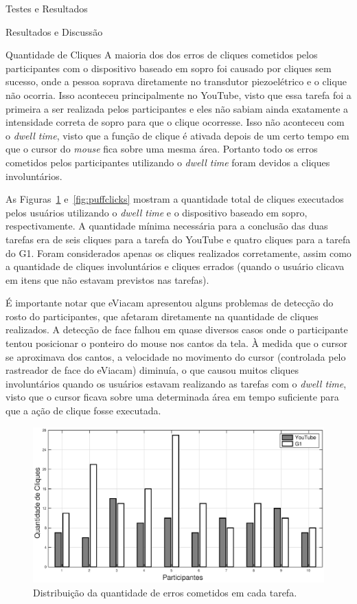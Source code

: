 \begin{chapter}{Testes e Resultados}
\begin{section}{Resultados e Discussão}
\begin{subsection}{Quantidade de Cliques}
A maioria dos dos erros de cliques cometidos pelos participantes com o
dispositivo baseado em sopro foi causado por cliques sem sucesso, onde a pessoa
soprava diretamente no transdutor piezoelétrico e o clique não ocorria. Isso
aconteceu principalmente no YouTube, visto que essa tarefa foi a primeira a ser
realizada pelos participantes e eles não sabiam ainda exatamente a intensidade
correta de sopro para que o clique ocorresse. Isso não aconteceu com o
\textit{dwell time}, visto que a função de clique é ativada depois de um certo
tempo em que o cursor do \textit{mouse} fica sobre uma mesma área. Portanto todo 
os erros cometidos pelos participantes utilizando o \textit{dwell time} foram
devidos a cliques involuntários.

As Figuras~\ref{fig:dwellclicks} e~\ref{fig:puffclicks} mostram a quantidade
total de cliques executados pelos usuários utilizando o \textit{dwell time} e o
dispositivo baseado em sopro, respectivamente. A quantidade mínima necessária
para a conclusão das duas tarefas era de seis cliques para a tarefa do YouTube e
quatro cliques para a tarefa do G1. Foram considerados apenas os cliques
realizados corretamente, assim como a quantidade de cliques involuntários e
cliques errados (quando o usuário clicava em itens que não estavam previstos nas
tarefas).


É importante notar que eViacam apresentou alguns problemas de detecção do rosto
do participantes, que afetaram diretamente na quantidade de cliques realizados.
A detecção de face falhou em quase diversos casos onde o participante tentou
posicionar o ponteiro do mouse nos cantos da tela. À medida que o cursor se
aproximava dos cantos, a velocidade no movimento do cursor (controlada pelo
rastreador de face do eViacam) diminuía, o que causou muitos cliques
involuntários quando os usuários estavam realizando as tarefas com o
\textit{dwell time}, visto que o cursor ficava sobre uma determinada área em
tempo suficiente para que a ação de clique fosse executada.

\begin{figure}[!h]
	\centering
	\includegraphics[width=1.00\linewidth]{fig/DwellClicks}
	\caption{Distribuição da quantidade de erros cometidos em cada tarefa.}
	\label{fig:dwellclicks}
\end{figure}


\end{subsection}
\end{section}
\end{chapter}

